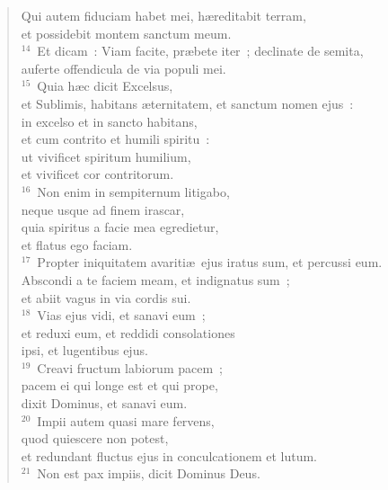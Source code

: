  \begin{flushleft}\begin{verse}Qui autem fiduciam habet mei, h\ae reditabit terram,\\ et possidebit montem sanctum meum.\\
${}^{14}$~Et dicam~: Viam facite, pr\ae bete iter~; declinate de semita,\\ auferte offendicula de via populi mei.\\
${}^{15}$~Quia h\ae c dicit Excelsus,\\ et Sublimis, habitans \ae ternitatem, et sanctum nomen ejus~:\\ in excelso et in sancto habitans,\\ et cum contrito et humili spiritu~:\\ ut vivificet spiritum humilium,\\ et vivificet cor contritorum.\\
${}^{16}$~Non enim in sempiternum litigabo,\\ neque usque ad finem irascar,\\ quia spiritus a facie mea egredietur,\\ et flatus ego faciam.\\
${}^{17}$~Propter iniquitatem avariti\ae\ ejus iratus sum, et percussi eum.\\ Abscondi a te faciem meam, et indignatus sum~;\\ et abiit vagus in via cordis sui.\\
${}^{18}$~Vias ejus vidi, et sanavi eum~;\\ et reduxi eum, et reddidi consolationes\\ ipsi, et lugentibus ejus.\\
${}^{19}$~Creavi fructum labiorum pacem~;\\ pacem ei qui longe est et qui prope,\\ dixit Dominus, et sanavi eum.\\
${}^{20}$~Impii autem quasi mare fervens,\\ quod quiescere non potest,\\ et redundant fluctus ejus in conculcationem et lutum.\\
${}^{21}$~Non est pax impiis, dicit Dominus Deus.\end{verse}\end{flushleft}



